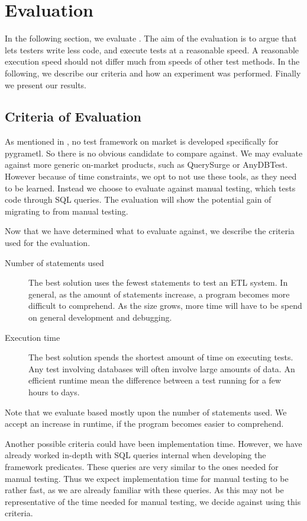 \section{Evaluation}\label{sect:eval}
In the following section, we evaluate \FW{}. The aim of the evaluation is to argue that \FW{} lets testers write less code, and execute tests at a reasonable speed. A reasonable execution speed should not differ much from speeds of other test methods. In the following, we describe our criteria and how an experiment was performed. Finally we present our results.

\subsection{Criteria of Evaluation}\label{subsect:CoE}
As mentioned in , no test framework on market is developed specifically for pygrametl. So there is no obvious candidate to compare against. We may evaluate against more generic on-market products, such as QuerySurge or AnyDBTest. However because of time constraints, we opt to not use these tools, as they need to be learned. Instead we choose to evaluate against manual testing, which tests code through SQL queries. The evaluation will show the potential gain of migrating to \FW{} from manual testing.

Now that we have determined what to evaluate \FW{} against, we describe the criteria used for the evaluation.

\begin{description}
\item[Number of statements used] The best solution uses the fewest statements to test an ETL system. In general, as the amount of statements increase, a program becomes more difficult to comprehend. As the size grows, more time will have to be spend on general development and debugging.
\item[Execution time] The best solution spends the shortest amount of time on executing tests. Any test involving databases will often involve large amounts of data. An efficient runtime mean the difference between a test running for a few hours to days.
\end{description}

Note that we evaluate based mostly upon the number of statements used. We accept an increase in runtime, if the program becomes easier to comprehend.

Another possible criteria could have been implementation time. However, we have already worked in-depth with SQL queries internal when developing the framework predicates. These queries are very similar to the ones needed for manual testing. Thus we expect implementation time for manual testing to be rather fast, as we are already familiar with these queries. As this may not be representative of the time needed for manual testing, we decide against using this criteria.


